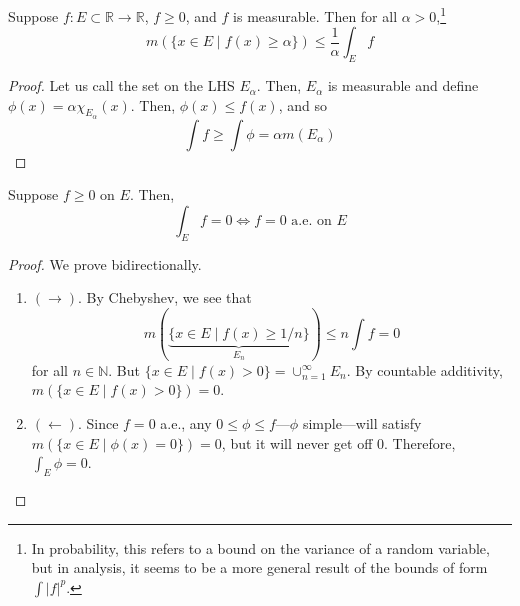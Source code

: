   \begin{lemma}[Chebyshev]
    Suppose $f: E \subset \mathbb{R} \to \mathbb{R}$, $f \geq 0$, and $f$ is measurable. Then for all $\alpha > 0$,\footnote{In probability, this refers to a bound on the variance of a random variable, but in analysis, it seems to be a more general result of the bounds of form $\int |f|^p$.} 
    \begin{equation}
      m( \{ x \in E \mid f(x) \geq \alpha\}) \leq \frac{1}{\alpha} \int_E f 
    \end{equation}
  \end{lemma}
  \begin{proof}
    Let us call the set on the LHS $E_\alpha$. Then, $E_\alpha$ is measurable and define $\phi(x) = \alpha \chi_{E_\alpha} (x)$. Then, $\phi(x) \leq f(x)$, and so 
    \begin{equation}
      \int f \geq \int \phi = \alpha m(E_\alpha)
    \end{equation}
  \end{proof}

  \begin{theorem}
    Suppose $f \geq 0$ on $E$. Then, 
    \begin{equation}
      \int_E f = 0 \iff f = 0 \text{ a.e. on } E
    \end{equation}
  \end{theorem}
  \begin{proof}
    We prove bidirectionally. 
    \begin{enumerate}
      \item $(\rightarrow)$. By Chebyshev, we see that 
        \begin{equation}
          m(\underbrace{\{ x \in E \mid f(x) \geq 1/n \}}_{E_n}) \leq n \int f = 0 
        \end{equation}
        for all $n \in \mathbb{N}$. But $\{x \in E \mid f(x) > 0\} = \cup_{n=1}^\infty E_n$. By countable additivity, $m(\{x \in E \mid f(x) > 0\}) = 0$. 

      \item $(\leftarrow)$. Since $f = 0$ a.e., any $0 \leq \phi \leq f$---$\phi$ simple---will satisfy $m(\{x \in E \mid \phi(x) = 0 \}) = 0$, but it will never get off $0$. Therefore, $\int_E \phi = 0$. 
    \end{enumerate}
  \end{proof}

